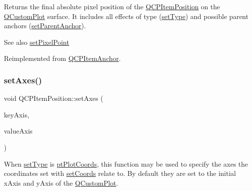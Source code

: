 Returns the final absolute pixel position of the \mbox{\hyperlink{class_q_c_p_item_position}{Q\+C\+P\+Item\+Position}} on the \mbox{\hyperlink{class_q_custom_plot}{Q\+Custom\+Plot}} surface. It includes all effects of type (\mbox{\hyperlink{class_q_c_p_item_position_aa476abf71ed8fa4c537457ebb1a754ad}{set\+Type}}) and possible parent anchors (\mbox{\hyperlink{class_q_c_p_item_position_ac094d67a95d2dceafa0d50b9db3a7e51}{set\+Parent\+Anchor}}).

\begin{DoxySeeAlso}{See also}
\mbox{\hyperlink{class_q_c_p_item_position_ab404e56d9ac2ac2df0382c57933a71ef}{set\+Pixel\+Point}} 
\end{DoxySeeAlso}


Reimplemented from \mbox{\hyperlink{class_q_c_p_item_anchor_ae1a21d9471d1d788624cad297e1b8d6f}{Q\+C\+P\+Item\+Anchor}}.

\mbox{\label{class_q_c_p_item_position_a2185f45c75ac8cb9be89daeaaad50e37}} 
\subsubsection{\texorpdfstring{set\+Axes()}{setAxes()}}
{\footnotesize\ttfamily void Q\+C\+P\+Item\+Position\+::set\+Axes (\begin{DoxyParamCaption}\item[{\mbox{\hyperlink{class_q_c_p_axis}{Q\+C\+P\+Axis}} $\ast$}]{key\+Axis,  }\item[{\mbox{\hyperlink{class_q_c_p_axis}{Q\+C\+P\+Axis}} $\ast$}]{value\+Axis }\end{DoxyParamCaption})}

When \mbox{\hyperlink{class_q_c_p_item_position_aa476abf71ed8fa4c537457ebb1a754ad}{set\+Type}} is \mbox{\hyperlink{class_q_c_p_item_position_aad9936c22bf43e3d358552f6e86dbdc8ad5ffb8dc99ad73263f7010c77342294c}{pt\+Plot\+Coords}}, this function may be used to specify the axes the coordinates set with \mbox{\hyperlink{class_q_c_p_item_position_aa988ba4e87ab684c9021017dcaba945f}{set\+Coords}} relate to. By default they are set to the initial x\+Axis and y\+Axis of the \mbox{\hyperlink{class_q_custom_plot}{Q\+Custom\+Plot}}. \mbox{\label{class_q_c_p_item_position_a0cd9b326fb324710169e92e8ca0041c2}} 

